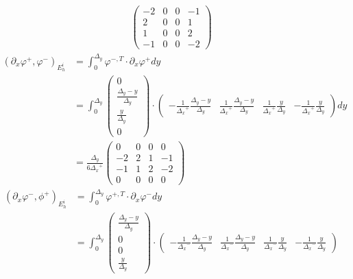 \documentclass{mc2013}
\newcommand\tf{\varphi}
\renewcommand{\(}{\left(}
\renewcommand{\)}{\right)}
\renewcommand{\[}{\left[}
\renewcommand{\]}{\right]}
\begin{document}
\begin{itemize}
\begin{equation}
\begin{split}
\begin{pmatrix}
-2 & 0 & 0 & -1 \\
2 & 0 & 0 & 1 \\
1 & 0 & 0 & 2 \\
-1 & 0 & 0 & -2
\end{pmatrix}
\end{split}
\end{equation}
\begin{equation}
\begin{split}
\(\partial_x \tf^{+},\tf^{-}\)_{E_h^i} &= \int_0^{\Delta _y} \tf^{-,T} \cdot
\partial_x \tf^{+} dy\\
&= \int_0^{\Delta _y} 
\begin{pmatrix}
0 \\
\frac{{\Delta _y}-y}{{\Delta _y}} \\
\frac{y}{{\Delta _y}} \\
0
\end{pmatrix}
\cdot
\begin{pmatrix}
-\frac{1}{{\Delta _x}^+}\frac{{\Delta _y}-y}{{\Delta _y}} & \frac{1}{{\Delta _x}^+} \frac{{\Delta _y}-y}{{\Delta _y}} & \frac{1}{{\Delta _x}^+}
\frac{y}{{\Delta _y}} & -\frac{1}{{\Delta _x}^+} \frac{y}{{\Delta _y}} 
\end{pmatrix}
dy\\
&= \frac{{\Delta _y}}{6{\Delta _x}^+}
\begin{pmatrix}
0 & 0 & 0 & 0 \\
-2 & 2 & 1 & -1 \\
-1 & 1 & 2 & -2 \\
0 & 0 & 0 & 0
\end{pmatrix}
\end{split}
\end{equation}
\begin{equation}
\begin{split}
\(\partial_x \tf^-,\phi^{+}\)_{E_h^i} &= \int_0^{\Delta _y} \tf^{+,T}\cdot \partial_x
\tf^{-} dy\\
&=\int_0^{\Delta _y}
\begin{pmatrix}
\frac{{\Delta _y}-y}{{\Delta _y}}\\
0 \\
0 \\
\frac{y}{{\Delta _y}}
\end{pmatrix}
\cdot
\begin{pmatrix}
-\frac{1}{{\Delta _x}^-}\frac{{\Delta _y}-y}{{\Delta _y}} & \frac{1}{{\Delta _x}^-} \frac{{\Delta _y}-y}{{\Delta _y}} & \frac{1}{{\Delta _x}^-}
\frac{y}{{\Delta _y}} & -\frac{1}{{\Delta _x}^-}\frac{y}{{\Delta _y}}

\end{pmatrix}
\end{split}
\end{equation}
\end{itemize}
\end{document}
